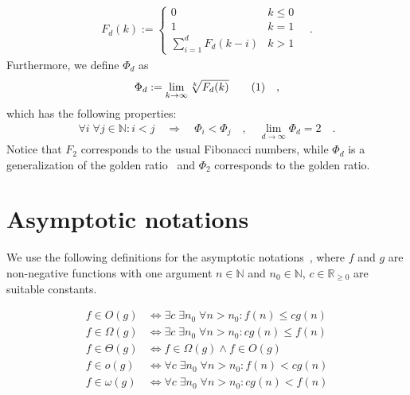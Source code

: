 \documentclass[a4paper,12pt]{article}
\newcommand\numberthis{\addtocounter{equation}{1}\tag{\theequation}}
\newcommand\neqn[1]{\numberthis\label{eqn:#1}}
\begin{document}
\begin{align*}
F_d(k) := \begin{cases}
                0               & k \leq 0\\
                1               & k = 1\\
                \sum_{i=1}^{d}F_d(k-i) & k > 1
            \end{cases}
\quad .
\end{align*}
Furthermore, we define $\Phi_d$ as
\begin{align*}
\Phi_d := \lim_{k \rightarrow \infty} \sqrt[k]{F_d(k)} \neqn{goldenFib} \quad ,
\end{align*}
which has the following properties:
\begin{align*}
\forall i\; \forall j \in \mathbb{N}: i < j \quad \Rightarrow \quad \Phi_i < \Phi_j \quad , \quad \lim_{d\rightarrow \infty} \Phi_d = 2 \quad .
\end{align*}
Notice that $F_2$ corresponds to the usual Fibonacci numbers, while $\Phi_d$ is a generalization of the golden ratio~\cite{Knuth73} and $\Phi_2 $ corresponds to the golden ratio.

\section{Asymptotic notations}
\label{sec:asymptotic}
We use the following definitions for the asymptotic notations~\cite{CLRS01}, where $f$ and $g$ are non-negative functions with one argument $n\in \mathbb{N}$ and $n_0 \in \mathbb{N}$, $c \in \mathbb{R}_{\geq 0}$ are suitable constants.

\begin{align*}
f \in O(g) &\Leftrightarrow \exists c\; \exists n_0 \;\forall n> n_0: f(n)\leq c g(n) \\
f \in \Omega(g) &\Leftrightarrow \exists c \; \exists n_0\;\forall n> n_0: cg(n) \leq f(n) \\
f \in \Theta(g) &\Leftrightarrow f \in \Omega(g) \land f\in O(g) \\
f \in o(g) &\Leftrightarrow \forall c \; \exists n_0\;\forall n> n_0: f(n) < cg(n) \\
f \in \omega(g) &\Leftrightarrow \forall c \; \exists n_0\;\forall n> n_0: cg(n) < f(n) \\
\end{align*}
\end{document}
